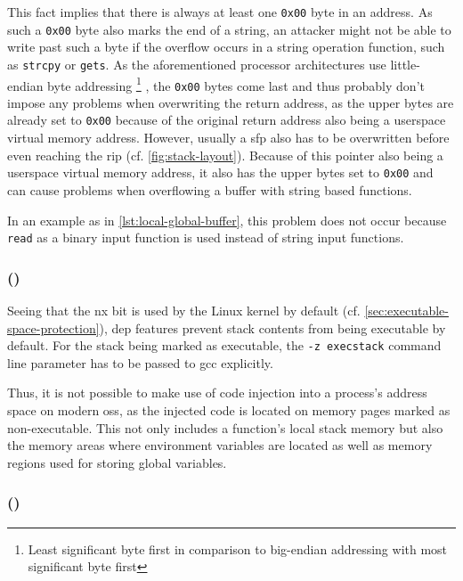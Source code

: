 This fact implies that there is always at least one \texttt{0x00} byte in an address.
As such a \texttt{0x00} byte also marks the end of a string, an attacker might not be able to write past such a byte if the overflow occurs in a string operation function, such as \texttt{strcpy} or \texttt{gets}.
As the aforementioned processor architectures use little-endian byte addressing%
	\footnote{Least significant byte first in comparison to big-endian addressing with most significant byte first}%
, the \texttt{0x00} bytes come last and thus probably don't impose any problems when overwriting the return address, as the upper bytes are already set to \texttt{0x00} because of the original return address also being a userspace virtual memory address. 
However, usually a \gls{sfp} also has to be overwritten before even reaching the \gls{rip} (cf. \cref{fig:stack-layout}).
Because of this pointer also being a userspace virtual memory address, it also has the upper bytes set to \texttt{0x00} and can cause problems when overflowing a buffer with string based functions.

In an example as in \cref{lst:local-global-buffer}, this problem does not occur because \texttt{read} as a binary input function is used instead of string input functions.

\subsubsection{ ()}
\label{subsubsec:ci-data-execution-prevention}

Seeing that the \gls{nx} bit is used by the Linux kernel by default (cf. \cref{sec:executable-space-protection}), \gls{dep} features prevent stack contents from being executable by default.
For the stack being marked as executable, the \texttt{-z execstack} command line parameter has to be passed to \gls{gcc} explicitly.

Thus, it is not possible to make use of code injection into a process's address space on modern \glspl{os}, as the injected code is located on memory pages marked as non-executable.
This not only includes a function's local stack memory but also the memory areas where environment variables are located as well as memory regions used for storing global variables.

\subsubsection{ ()}
\label{subsubsec:ci-aslr}

